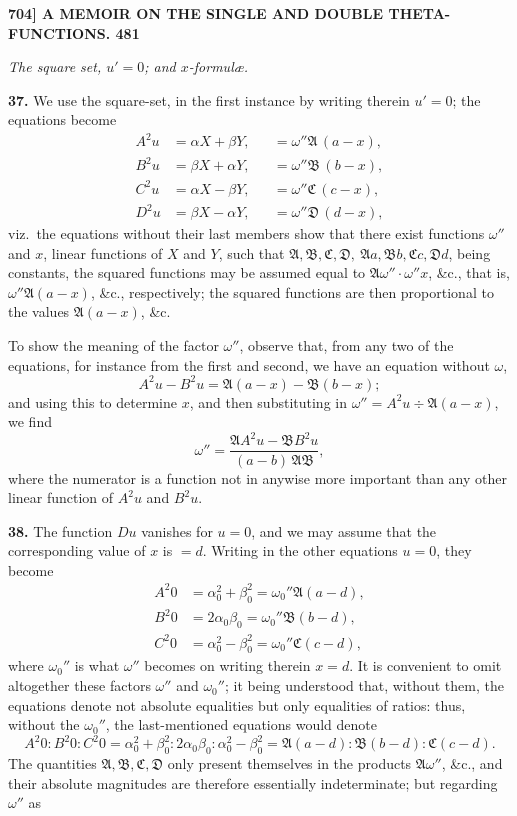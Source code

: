 \documentclass[11pt]{article}
\newcommand{\Ag}{\mathfrak{A}}
\newcommand{\Bg}{\mathfrak{B}}
\newcommand{\Cg}{\mathfrak{C}}
\newcommand{\Dg}{\mathfrak{D}}
\begin{document}
\noindent\textbf{704] \quad A MEMOIR ON THE SINGLE AND DOUBLE THETA-FUNCTIONS. \hfill 481}

\medskip
\begin{center}\textit{The square set, $u'=0$; and $x$-formul\ae.}\end{center}

\textbf{37.} We use the square-set, in the first instance by writing therein $u'=0$; the equations become
\[
\begin{aligned}
A^2 u &= \alpha X + \beta Y, &&= \omega''\Ag\,(a-x),\\
B^2 u &= \beta X + \alpha Y, &&= \omega''\Bg\,(b-x),\\
C^2 u &= \alpha X - \beta Y, &&= \omega''\Cg\,(c-x),\\
D^2 u &= \beta X - \alpha Y, &&= \omega''\Dg\,(d-x),
\end{aligned}
\]
viz.\ the equations without their last members show that there exist functions $\omega''$ and $x$, linear functions of $X$ and $Y$, such that $\Ag,\Bg,\Cg,\Dg,\ \Ag a,\Bg b,\Cg c,\Dg d$, being constants, the squared functions may be assumed equal to $\Ag\omega''\cdot\omega''x$, \&c., that is, $\omega''\Ag(a-x)$, \&c., respectively; the squared functions are then proportional to the values $\Ag(a-x)$, \&c.

To show the meaning of the factor $\omega''$, observe that, from any two of the equations, for instance from the first and second, we have an equation without $\omega$,
\[
A^2 u - B^2 u = \Ag(a-x) - \Bg(b-x);
\]
and using this to determine $x$, and then substituting in $\omega'' = A^2 u \div \Ag(a-x)$, we find
\[
\omega'' = \frac{\Ag A^2 u - \Bg B^2 u}{(a-b)\,\Ag\Bg},
\]
where the numerator is a function not in anywise more important than any other linear function of $A^2 u$ and $B^2 u$.

\medskip
\textbf{38.} The function $Du$ vanishes for $u=0$, and we may assume that the corresponding value of $x$ is $=d$. Writing in the other equations $u=0$, they become
\[
\begin{aligned}
A^2 0 &= \alpha_0^2 + \beta_0^2 = \omega_0''\Ag(a-d),\\
B^2 0 &= 2\alpha_0\beta_0 = \omega_0''\Bg(b-d),\\
C^2 0 &= \alpha_0^2 - \beta_0^2 = \omega_0''\Cg(c-d),
\end{aligned}
\]
where $\omega_0''$ is what $\omega''$ becomes on writing therein $x=d$. It is convenient to omit altogether these factors $\omega''$ and $\omega_0''$; it being understood that, without them, the equations denote not absolute equalities but only equalities of ratios: thus, without the $\omega_0''$, the last-mentioned equations would denote
\[
A^2 0 : B^2 0 : C^2 0 = \alpha_0^2+\beta_0^2 : 2\alpha_0\beta_0 : \alpha_0^2-\beta_0^2 = \Ag(a-d) : \Bg(b-d) : \Cg(c-d).
\]
The quantities $\Ag,\Bg,\Cg,\Dg$ only present themselves in the products $\Ag\omega''$, \&c., and their absolute magnitudes are therefore essentially indeterminate; but regarding $\omega''$ as
\end{document}
